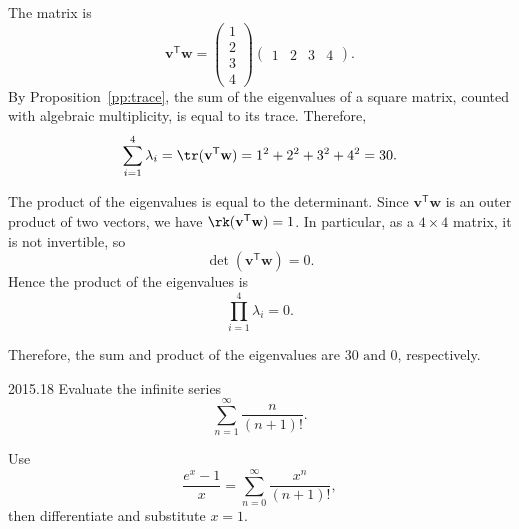     \begin{solution}
        The matrix is
        \[
            \mathbf{v}^{\mathsf T}\mathbf{w}
            =
            \begin{pmatrix}
                1 \\
                2 \\
                3 \\
                4
            \end{pmatrix}
            \begin{pmatrix}
                1 & 2 & 3 & 4
            \end{pmatrix}.
        \]
        By Proposition~\ref{pp:trace}, the sum of the eigenvalues of a square matrix, counted with algebraic multiplicity, is equal
        to its trace. Therefore,
        \[
            \sum_{i=1}^{4}\lambda_i
            =
            \tr(\mathbf{v}^{\mathsf T}\mathbf{w})
            =
            1^2+2^2+3^2+4^2
            =
            30.
        \]

        The product of the eigenvalues is equal to the determinant. Since $\mathbf{v}^{\mathsf
        T}\mathbf{w}$ is an outer product of two vectors, we have $\rk(\mathbf{v}^{\mathsf
        T}\mathbf{w})=1$. In particular, as a $4\times 4$ matrix, it is not invertible, so
        \[
            \det(\mathbf{v}^{\mathsf T}\mathbf{w})=0.
        \]
        Hence the product of the eigenvalues is
        \[
            \prod_{i=1}^{4}\lambda_i=0.
        \]

        Therefore, the sum and product of the eigenvalues are $\boxed{30\text{ and }0}$,
        respectively.
    \end{solution}

    \begin{pastproblem}{2015.18}
        Evaluate the infinite series
        \[
            \sum_{n=1}^{\infty}\frac{n}{(n+1)!}.
        \]

        \begin{hint}
            Use
            \[
                \frac{e^x-1}{x}
                =
                \sum_{n=0}^{\infty}\frac{x^n}{(n+1)!},
            \]
            then differentiate and substitute $x=1$.
        \end{hint}
    \end{pastproblem}

